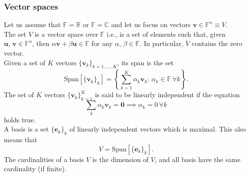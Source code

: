 \documentclass{article}
\begin{document}
\subsubsection{Vector spaces}
Let us assume that $\mathbb{F}=\mathbb{R}$ or $\mathbb{F} = \mathbb{C}$ and let us focus on vectors $\mathbf{v}\in\mathbb{F}^n\equiv V$.\\
The set $V$ is a vector space over $\mathbb{F}$ i.e., is a set of elements such that, given $\mathbf{u},\,\mathbf{v}\in\mathbb{F}^n$, then $\alpha\mathbf{v}+\beta\mathbf{u}\in\mathbb{F}$ for any $\alpha,\,\beta\in\mathbb{F}$. In particular, $V$ contains the zero vector.\\
Given a set of $K$ vectors $\{\mathbf{v}_k\}_{k=1,\ldots,\,K}$, its span is the set
\begin{equation}
    \text{Span}[\{\mathbf{v}_k\}_k]=\left\{ \sum_{k=1}^K \alpha_k\mathbf{v}_k:\, \alpha_k\in\mathbb{F}\,\forall k \right\}.
\end{equation}
The set of $K$ vectors $\{\mathbf{v}_k\}_{k=1}^K$ is said to be linearly independent if the equation
\begin{equation}
    \sum_k \alpha_k\mathbf{v}_k = \mathbf{0}\implies\alpha_k=0\,\forall k
\end{equation}
holds true.\\
A basis is a set $\{\mathbf{e}_k\}_k$ of linearly independent vectors which is maximal. This also means that
\begin{equation}
    V = \text{Span}[\{\mathbf{e}_k\}_k].
\end{equation}
The cardinalities of a basis $V$ is the dimension of $V$, and all basis have the same cardinality (if finite).
\end{document}
